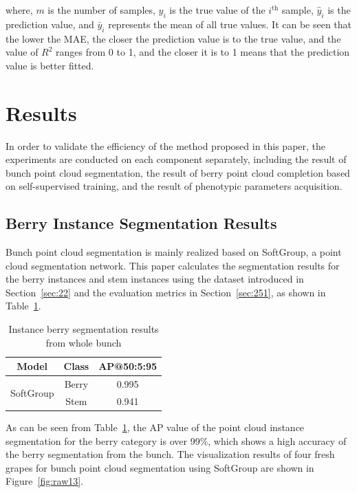 \documentclass[12pt]{article}
\begin{document}
{\raggedright where, $m$ is the number of samples, $y_i$ is the true value of the $i^{\text{th}}$ sample, $\hat{y}_i$ is the prediction value, and $\bar{y}_i$ represents the mean of all true values. 
It can be seen that the lower the MAE, the closer the prediction value is to the true value, and the value of $R^2$ ranges from 0 to 1, and the closer it is to 1 means that the prediction value is better fitted.}

\section{Results}

In order to validate the efficiency of the method proposed in this paper, the experiments are conducted on each component separately, including the result of bunch point cloud segmentation, the result of berry point cloud completion based on self-supervised training, and the result of phenotypic parameters acquisition.

\subsection{Berry Instance Segmentation Results}

Bunch point cloud segmentation is mainly realized based on SoftGroup, a point cloud segmentation network. 
This paper calculates the segmentation results for the berry instances and stem instances using the dataset introduced in Section~\ref{sec:22} and the evaluation metrics in Section~\ref{sec:251}, as shown in Table~\ref{tbl:3}.

\begin{table}[h]
    \centering
    \caption{Instance berry segmentation results from whole bunch}
    \begin{tabular}{ccc}
        \hline
        \textbf{Model} & \textbf{Class} & \textbf{AP@50:5:95} \\
        \hline
        \multirow{2}{*}{SoftGroup \citep{vu_softgroup_2022}} & Berry & 0.995 \\
        \cline{2-3}
        & Stem & 0.941 \\
        \hline
    \end{tabular}
    \label{tbl:3}
\end{table}

As can be seen from Table~\ref{tbl:3}, the AP value of the point cloud instance segmentation for the berry category is over 99\%, which shows a high accuracy of the berry segmentation from the bunch. The visualization results of four fresh grapes for bunch point cloud segmentation using SoftGroup are shown in Figure~\ref{fig:raw13}.
\end{document}
